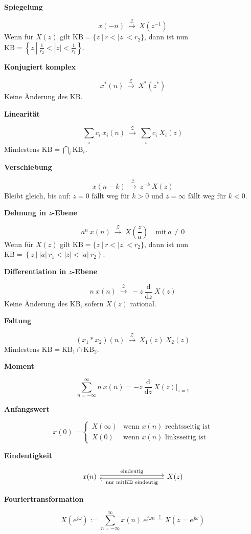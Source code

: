 \documentclass[10pt,a4paper]{article}
\newcommand{\fancyformula}[2]{
	\small\raggedright{\sffamily\textbf{#1}}
	#2
}
\newcommand{\ztransform}{
	~\xrightarrow{~\mathcal{Z}~}~
}
\begin{document}
\begin{multicols}{2}
	\fancyformula{Spiegelung}{
		\[ x(-n) \ztransform X \left(z^{-1} \right) \]
		\footnotesize Wenn für $X(z)$ gilt $\mathrm{KB} = \{ z ~ | ~ r < |z| < r_2 \}$, dann ist nun $\mathrm{KB} = \left \{ z ~ | ~ \frac{1}{r_2} < |z| < \frac{1}{r_1} \right \}$.
		\vspace{0.5em}
	}

	\fancyformula{Konjugiert komplex}{
		\[ x^{*}(n)\ztransform X^{*}(z^{*}) \]
		\footnotesize Keine Änderung des KB.
		\vspace{0.5em}
	}

	\fancyformula{Linearität}{
		\[ \sum_i c_i ~ x_i(n) \ztransform \sum_i c_i ~ X_i(z) \]
		\footnotesize Mindestens $\mathrm{KB} = \bigcap_i \mathrm{KB}_i$.
		\vspace{0.5em}
	}

	\fancyformula{Verschiebung}{
		\[ x(n-k) \ztransform z^{-k} ~ X(z) \]
		\footnotesize Bleibt gleich, bis auf: $z = 0$ fällt weg für $k > 0$ und $z = \infty$ fällt weg für $k < 0$.
		\vspace{0.5em}
	}

	\fancyformula{Dehnung in $z$-Ebene}{
		\[ a^n ~ x(n) \ztransform X\left(\frac{z}{a}\right) \quad \text{mit} ~ a \neq 0 \]
		\footnotesize Wenn für $X(z)$ gilt $\mathrm{KB} = \{ z ~ | ~ r < |z| < r_2 \}$, dann ist nun $\mathrm{KB} = \left \{ z ~ | ~ |a| ~ r_1 < |z| < |a| ~ r_2 \right \}$.
		\vspace{0.5em}
	}

	\fancyformula{Differentiation in $z$-Ebene}{
		\[ n ~ x(n) \ztransform -z ~ \frac{\mathrm d}{\mathrm dz} ~ X(z) \]
		\footnotesize Keine Änderung des KB, sofern $X(z)$ rational.
		\vspace{0.5em}
	}

	\fancyformula{Faltung}{
		\[ (x_1 * x_2)(n) \ztransform X_{1}(z) ~ X_{2}(z)\]
		\footnotesize Mindestens $\mathrm{KB} = \mathrm{KB}_1 \cap \mathrm{KB}_2$.
		\vspace{0.5em}
	}

	\fancyformula{Moment}{
		\[ \sum_{n=-\infty}^{\infty} n ~ x(n) = -z ~ \frac{\mathrm d}{\mathrm dz} ~ X(z) \bigg|_{z=1} \]
	}

	\fancyformula{Anfangswert}{
		\[
			x(0) = \begin{cases}
				X(\infty) & \text{wenn $x(n)$ rechtsseitig ist} \\
				X(0) & \text{wenn $x(n)$ linksseitig ist}
			\end{cases}
		\]
	}

	{\small\raggedright\sffamily\textbf{Eindeutigkeit}}
	\[
		\begin{tikzcd}[every arrow/.append style={shift left}, column sep = 9em]
			x(n) \arrow{r}{\text{eindeutig}} & X(z) \arrow{l}{\text{nur mit\newline KB eindeutig}}
		\end{tikzcd}
	\]

	\fancyformula{Fouriertransformation}{
		\[ X(e^{j\omega}) := \sum_{n = -\infty}^{\infty} x(n) ~ e^{j\omega n} \overset{!}{=} X(z = e^{j\omega}) \]
	}
\end{multicols}
\end{document}
